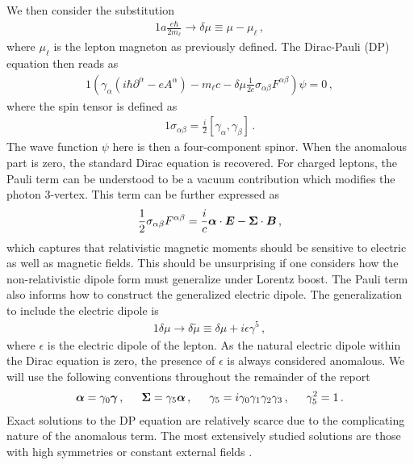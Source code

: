 We then consider the substitution
\begin{alignat}{1}
	\label{eq:diracpauli:01a} a\frac{e\hbar}{2m_{\ell}}\longrightarrow\delta\mu\equiv\mu-\mu_{\ell}\,,
\end{alignat}
where $\mu_{\ell}$ is the lepton magneton as previously defined. The Dirac-Pauli (DP) equation then reads as
\begin{alignat}{1}
	\label{eq:diracpauli:01b} \left(\gamma_{\alpha}(i\hbar\partial^{\alpha}-eA^{\alpha})-m_{\ell}c-\delta\mu\frac{1}{2c}\sigma_{\alpha\beta}F^{\alpha\beta}\right)\psi=0\,,
\end{alignat}
where the spin tensor is defined as
\begin{alignat}{1}
	\label{eq:diracpauli:02} \sigma_{\alpha\beta}=\frac{i}{2}\left[\gamma_{\alpha},\gamma_{\beta}\right]\,.
\end{alignat}
The wave function $\psi$ here is then a four-component spinor. When the anomalous part is zero, the standard Dirac equation is recovered. For charged leptons, the Pauli term can be understood to be a vacuum contribution which modifies the photon 3-vertex. This term can be further expressed as
\begin{alignat}{1}
	\label{eq:diracpauli:03} \frac{1}{2}\sigma_{\alpha\beta}F^{\alpha\beta}=\frac{i}{c}\boldsymbol{\alpha}\cdot\boldsymbol{E}-\boldsymbol{\Sigma}\cdot\boldsymbol{B}\,,
\end{alignat}
which captures that relativistic magnetic moments should be sensitive to electric as well as magnetic fields. This should be unsurprising if one considers how the non-relativistic dipole form must generalize under Lorentz boost. The Pauli term also informs how to construct the generalized electric dipole. The generalization to include the electric dipole is
\begin{alignat}{1}
	\label{eq:diracpauli:04} \delta\mu\rightarrow\delta\tilde{\mu}\equiv\delta\mu+i\epsilon\gamma^{5}\,,
\end{alignat}
where $\epsilon$ is the electric dipole of the lepton. As the natural electric dipole within the Dirac equation is zero, the presence of $\epsilon$ is always considered anomalous. We will use the following conventions throughout the remainder of the report
\begin{alignat}{1}
	\label{eq:diracpauli:05} \bb{\alpha}=\gamma_{0}\bb{\gamma}\,,\indent \bb{\Sigma}=\gamma_{5}\bb{\alpha}\,,\indent \gamma_{5}=i\gamma_{0}\gamma_{1}\gamma_{2}\gamma_{3}\,,\indent \gamma^{2}_{5}=1\,.
\end{alignat}
Exact solutions to the DP equation are relatively scarce due to the complicating nature of the anomalous term. The most extensively studied solutions are those with high symmetries or constant external fields \cite{Thaller:2013,Bagrov:2014}.


